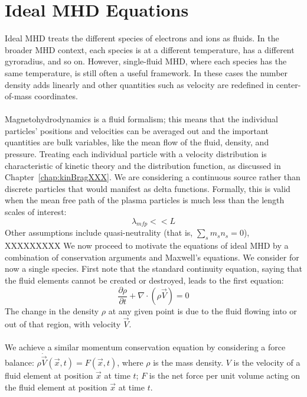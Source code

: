 \section{Ideal MHD Equations}
Ideal MHD treats the different species of electrons and ions as fluids. In the broader MHD context, each species is at a different temperature, has a different gyroradius, and so on. However, single-fluid MHD, where each species has the same temperature, is still often a useful framework. In these cases the number density adds linearly and other quantities such as velocity are redefined in center-of-mass coordinates.\\
\\
Magnetohydrodynamics is a fluid formalism; this means that the individual particles' positions and velocities can be averaged out and the important quantities are bulk variables, like the mean flow of the fluid, density, and pressure. Treating each individual particle with a velocity distribution is characteristic of kinetic theory and the distribution function, as discussed in Chapter~\ref{chap:kinBragXXX}. We are considering a continuous source rather than discrete particles that would manifest as delta functions. Formally, this is valid when the mean free path of the plasma particles is much less than the length scales of interest:
\begin{equation}
  \lambda_{mfp}<<L
\end{equation}
Other assumptions include quasi-neutrality (that is, $\sum_s m_s n_s=0$), 
\\
XXXXXXXXX
We now proceed to motivate the equations of ideal MHD by a combination of conservation arguments and Maxwell's equations. We consider for now a single species. First note that the standard continuity equation, saying that the fluid elements cannot be created or destroyed, leads to the first equation:
\begin{equation}
  \frac{\partial\rho}{\partial t}+\nabla\cdot\left(\rho\vec V\right)=0\label{eq:continuity}
\end{equation}
The change in the density $\rho$ at any given point is due to the fluid flowing into or out of that region, with velocity $\vec V$. \\
\\
We achieve a similar momentum conservation equation by considering a force balance: $\rho \dot{\vec V}(\vec x,t)=F(\vec x,t)$, where $\rho$ is the mass density. $V$ is the velocity of a fluid element at position $\vec x$ at time $t$; $F$ is the net force per unit volume acting on the fluid element at position $\vec x$ at time $t$.\\

